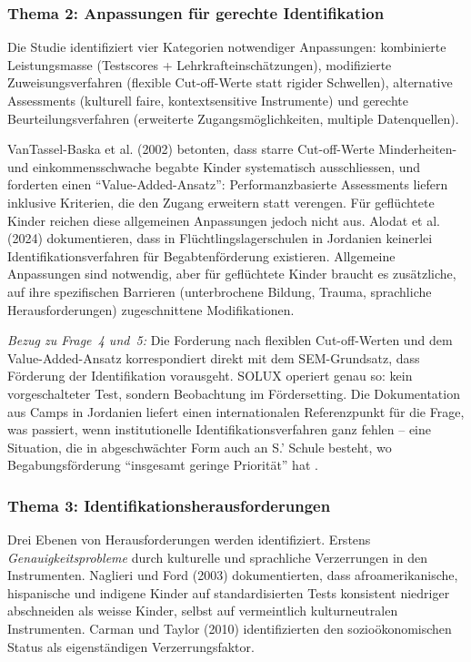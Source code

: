 \documentclass[ngerman, a4paper]{article}
\begin{document}
\subsubsection*{Thema 2: Anpassungen für gerechte Identifikation}

Die Studie identifiziert vier Kategorien notwendiger Anpassungen:
kombinierte Leistungsmasse (Testscores + Lehrkrafteinschätzungen),
modifizierte Zuweisungsverfahren (flexible Cut-off-Werte statt rigider
Schwellen), alternative Assessments (kulturell faire, kontextsensitive
Instrumente) und gerechte Beurteilungsverfahren (erweiterte
Zugangsmöglichkeiten, multiple Datenquellen).

VanTassel-Baska et al. (2002) betonten, dass starre Cut-off-Werte
Minderheiten- und einkommensschwache begabte Kinder systematisch
ausschliessen, und forderten einen \enquote{Value-Added-Ansatz}:
Performanzbasierte Assessments liefern inklusive Kriterien, die den Zugang
erweitern statt verengen. Für geflüchtete Kinder reichen diese allgemeinen
Anpassungen jedoch nicht aus. Alodat et al. (2024) dokumentieren, dass in
Flüchtlingslagerschulen in Jordanien keinerlei Identifikationsverfahren
für Begabtenförderung existieren. Allgemeine Anpassungen sind notwendig,
aber für geflüchtete Kinder braucht es zusätzliche, auf ihre spezifischen
Barrieren (unterbrochene Bildung, Trauma, sprachliche Herausforderungen)
zugeschnittene Modifikationen.

\textit{Bezug zu Frage~4 und~5:} Die Forderung nach flexiblen
Cut-off-Werten und dem Value-Added-Ansatz korrespondiert direkt mit dem
SEM-Grundsatz, dass Förderung der Identifikation vorausgeht. SOLUX
operiert genau so: kein vorgeschalteter Test, sondern Beobachtung im
Fördersetting. Die Dokumentation aus Camps in Jordanien liefert einen
internationalen Referenzpunkt für die Frage, was passiert, wenn
institutionelle Identifikationsverfahren ganz fehlen -- eine Situation, die
in abgeschwächter Form auch an S.' Schule besteht, wo Begabungsförderung
\enquote{insgesamt geringe Priorität} hat
\parencite{dvs2025bbf}.

\subsubsection*{Thema 3: Identifikationsherausforderungen}

Drei Ebenen von Herausforderungen werden identifiziert. Erstens
\textit{Genauigkeitsprobleme} durch kulturelle und sprachliche
Verzerrungen in den Instrumenten. Naglieri und Ford (2003) dokumentierten,
dass afroamerikanische, hispanische und indigene Kinder auf
standardisierten Tests konsistent niedriger abschneiden als weisse Kinder,
selbst auf vermeintlich kulturneutralen Instrumenten. Carman und Taylor
(2010) identifizierten den sozioökonomischen Status als eigenständigen
Verzerrungsfaktor.
\end{document}
